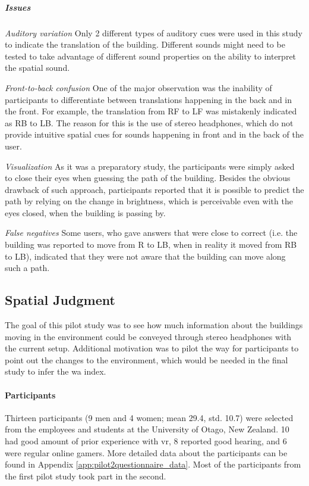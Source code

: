 \subparagraph{Issues} 
\textit{Auditory variation} Only 2 different types of auditory cues were used in this study to indicate the translation of the building. Different sounds might need to be tested to take advantage of different sound properties on the ability to interpret the spatial sound. 

\textit{Front-to-back confusion} One of the major observation was the inability of participants to differentiate between translations happening in the back and in the front. For example, the translation from RF to LF was mistakenly indicated as RB to LB. The reason for this is the use of stereo headphones, which do not provide intuitive spatial cues for sounds happening in front and in the back of the user.

\textit{Visualization} As it was a preparatory study, the participants were simply asked to close their eyes when guessing the path of the building. Besides the obvious drawback of such approach, participants reported that it is possible to predict the path by relying on the change in brightness, which is perceivable even with the eyes closed, when the building is passing by.

\textit{False negatives} Some users, who gave answers that were close to correct (i.e. the building was reported to move from R to LB, when in reality it moved from RB to LB), indicated that they were not aware that the building can move along such a path.









\subsection{Spatial Judgment}
\label{study_two}
The goal of this pilot study was to see how much information about the buildings moving in the environment could be conveyed through stereo headphones with the current setup. Additional motivation was to pilot the way for participants to point out the changes to the environment, which would be needed in the final study to infer the \gls{wa} index. 

\paragraph{Participants}
Thirteen participants (9 men and 4 women; mean 29.4, std. 10.7) were selected from the employees and students at the University of Otago, New Zealand. 10 had good amount of prior experience with \gls{vr}, 8 reported good hearing, and 6 were regular online gamers. More detailed data about the participants can be found in Appendix \ref{app:pilot2questionnaire_data}. Most of the participants from the first pilot study took part in the second.

